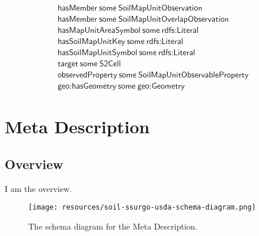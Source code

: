 \begin{align}
  \textsf{hasMember}~\textsf{some}~\textsf{SoilMapUnitObservation}\\
  \textsf{hasMember}~\textsf{some}~\textsf{SoilMapUnitOverlapObservation}\\
  \textsf{hasMapUnitAreaSymbol}~\textsf{some}~\textsf{rdfs:Literal}\\
  \textsf{hasSoilMapUnitKey}~\textsf{some}~\textsf{rdfs:Literal}\\
  \textsf{hasSoilMapUnitSymbol}~\textsf{some}~\textsf{rdfs:Literal}\\
  \textsf{target}~\textsf{some}~\textsf{S2Cell}\\
  \textsf{observedProperty}~\textsf{some}~\textsf{SoilMapUnitObservableProperty}\\
  \textsf{geo:hasGeometry}~\textsf{some}~\textsf{geo:Geometry}\end{align}



\section{Meta Description}
\label{sec:meta-description}
\subsection{Overview}
\label{ssec:overview}

I am the overview.

\begin{figure}[h!]
  \begin{center}
    \texttt{[image: resources/soil-ssurgo-usda-schema-diagram.png]}
  \end{center}
  \caption{The schema diagram for the Meta Description.}
  \label{fig:ov-diagram}
\end{figure}


